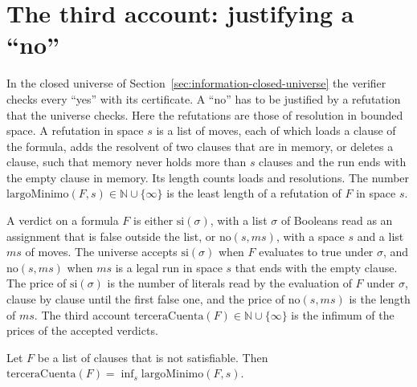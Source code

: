 \section{The third account: justifying a ``no''}
\label{sec:information-third-account}

In the closed universe of Section~\ref{sec:information-closed-universe} the verifier checks every
``yes'' with its certificate. A ``no'' has to be justified by a refutation that the universe
checks. Here the refutations are those of resolution in bounded space. A refutation in space $s$
is a list of moves, each of which loads a clause of the formula, adds the resolvent of two clauses
that are in memory, or deletes a clause, such that memory never holds more than $s$ clauses and the
run ends with the empty clause in memory. Its length counts loads and resolutions. The number
$\mathrm{largoMinimo}(F, s) \in \mathbb{N} \cup \{\infty\}$ is the least length of a refutation of
$F$ in space $s$.

\begin{definition}
  \label{def:information-third-account}
  \leanok
  A verdict on a formula $F$ is either $\mathrm{si}(\sigma)$, with a list $\sigma$ of Booleans read
  as an assignment that is false outside the list, or $\mathrm{no}(s, ms)$, with a space $s$ and a
  list $ms$ of moves. The universe accepts $\mathrm{si}(\sigma)$ when $F$ evaluates to true under
  $\sigma$, and $\mathrm{no}(s, ms)$ when $ms$ is a legal run in space $s$ that ends with the empty
  clause. The price of $\mathrm{si}(\sigma)$ is the number of literals read by the evaluation of $F$
  under $\sigma$, clause by clause until the first false one, and the price of $\mathrm{no}(s, ms)$
  is the length of $ms$. The third account $\mathrm{terceraCuenta}(F) \in \mathbb{N} \cup \{\infty\}$
  is the infimum of the prices of the accepted verdicts.
  \own{}
\end{definition}

\begin{theorem}
  \label{thm:information-third-account-length}
  \leanok
  Let $F$ be a list of clauses that is not satisfiable. Then
  $\mathrm{terceraCuenta}(F) = \inf_s \mathrm{largoMinimo}(F, s)$.
  \own{}
\end{theorem}

